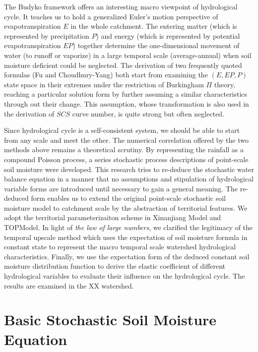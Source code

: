 \documentclass[11pt]{article}
\begin{document}
The Budyko framework offers an interesting macro viewpoint of hydrological cycle. It teaches us to hold a generalized Euler's motion perspective of evapotranspiration $E$ in the whole catchment. The entering matter (which is represented by precipitation $P$) and energy (which is represented by potential evapotranspiration $EP$) together determine the one-dimensional movement of water (to runoff or vaporize)  in a large temporal scale (average-annual) when soil moisture deficient could be neglected. The derivation of two frequently quoted formulas (Fu and Choudhury-Yang) both start from examining the $(E,EP,P)$ state space in their extremes under the restriction of Burkingham $\Pi$ theory, reaching a particular solution form by further assuming a similar characteristics through out their change. This assumption, whose transformation is also used in the derivation of $SCS$ curve number, is quite strong but often neglected.

Since hydrological cycle is a self-consistent system, we should be able to start from any scale and meet the other. The numerical correlation offered by the two methods above remains a theoretical scrutiny. By representing the rainfall as a compound Poisson process, a series stochastic process descriptions of point-scale soil moisture were developed. This research tries to re-deduce the stochastic water balance equation in a manner that no assumptions and stipulation of hydrological variable forms are introduced until necessary to gain a general meaning. The re-deduced form enables us to extend the original point-scale stochastic soil moisture model to catchment scale by the abstraction of territorial features. We adopt the  territorial parameterizaiton scheme in Xinanjiang Model and TOPModel. In light of \textit{the law of large numbers}, we clarified the legitimacy of the temporal upscale method which uses the expectation of soil moisture formula in constant state to represent the macro temporal scale watershed hydrological characteristics. Finally, we use the expectation form of the deduced constant soil moisture distribution function to derive the elastic coefficient of different hydrological variables to evaluate their influence on the hydrological cycle. The results are examined in the XX watershed. 


\section{Basic Stochastic Soil Moisture Equation} 
\end{document}
